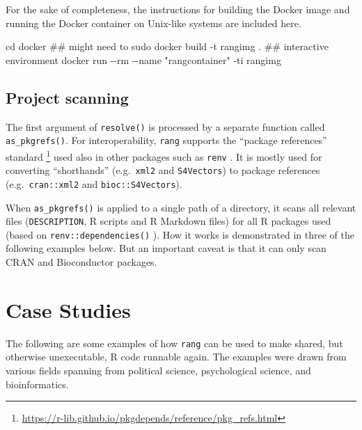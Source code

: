 \documentclass[
  10pt,
  letterpaper,
]{article}
\newenvironment{Shaded}{\begin{snugshade}}{\end{snugshade}}
\newcommand{\AttributeTok}[1]{\textcolor[rgb]{0.40,0.45,0.13}{#1}}
\newcommand{\BuiltInTok}[1]{\textcolor[rgb]{0.00,0.23,0.31}{#1}}
\newcommand{\CommentTok}[1]{\textcolor[rgb]{0.37,0.37,0.37}{#1}}
\newcommand{\ExtensionTok}[1]{\textcolor[rgb]{0.00,0.23,0.31}{#1}}
\newcommand{\NormalTok}[1]{\textcolor[rgb]{0.00,0.23,0.31}{#1}}
\newcommand{\StringTok}[1]{\textcolor[rgb]{0.13,0.47,0.30}{#1}}
\begin{document}
For the sake of completeness, the instructions for building the Docker
image and running the Docker container on Unix-like systems are included
here.

\begin{Shaded}
\begin{Highlighting}[]
\BuiltInTok{cd}\NormalTok{ docker}
\CommentTok{\#\# might need to sudo}
\ExtensionTok{docker}\NormalTok{ build }\AttributeTok{{-}t}\NormalTok{ rangimg .}
\CommentTok{\#\# interactive environment}
\ExtensionTok{docker}\NormalTok{ run }\AttributeTok{{-}{-}rm} \AttributeTok{{-}{-}name} \StringTok{"rangcontainer"} \AttributeTok{{-}ti}\NormalTok{ rangimg}
\end{Highlighting}
\end{Shaded}

\hypertarget{project-scanning}{%
\subsection{Project scanning}\label{project-scanning}}

The first argument of \texttt{resolve()} is processed by a separate
function called \texttt{as\_pkgrefs()}. For interoperability,
\texttt{rang} supports the ``package references'' standard \footnote{\url{https://r-lib.github.io/pkgdepends/reference/pkg_refs.html}}
used also in other packages such as \texttt{renv} \citep{renvrpkg}. It
is mostly used for converting ``shorthands'' (e.g.~\texttt{xml2} and
\texttt{S4Vectors}) to package references (e.g.~\texttt{cran::xml2} and
\texttt{bioc::S4Vectors}).

When \texttt{as\_pkgrefs()} is applied to a single path of a directory,
it scans all relevant files (\texttt{DESCRIPTION}, R scripts and R
Markdown files) for all R packages used (based on
\texttt{renv::dependencies()} ). How it works is demonstrated in three
of the following examples below. But an important caveat is that it can
only scan CRAN and Bioconductor packages.

\hypertarget{case-studies}{%
\section{Case Studies}\label{case-studies}}

The following are some examples of how \texttt{rang} can be used to make
shared, but otherwise unexecutable, R code runnable again. The examples
were drawn from various fields spanning from political science,
psychological science, and bioinformatics.
\end{document}

